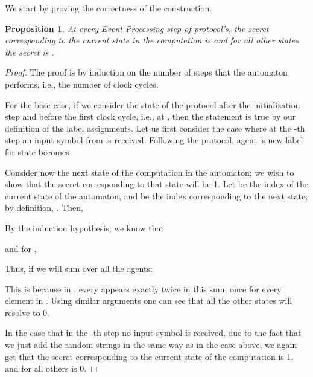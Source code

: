 \documentclass[letterpaper,11pt]{article}
\newtheorem{proposition}[theorem]{Proposition}
\begin{document}
We start by proving  the correctness of the construction.


\begin{proposition}
\label{prop-all}
At every Event Processing step of protocol's,
the secret corresponding
to the current state in the computation is  and for all other states 
the secret is .
\end{proposition}
\begin {proof}
The proof is
by induction on the number of steps  that the automaton performs, i.e., 
the number of clock cycles.

For the base case, if we consider the state of the protocol
after the initialization step and before the first clock cycle, i.e.,
at , then the statement is true by our definition of the label
assignments. Let us first consider the case where at the -th step
an input symbol  from  is received.  
Following the protocol,
agent 's new label for state  becomes


Consider now the next state of the computation in the automaton; we
wish to show that the secret corresponding to that state will be 1.
Let  be the index of the current state of the automaton, and
 be the index corresponding to the next state; by definition,
. Then, 
 
 

By the induction hypothesis, we know that 
 
and for , 
 

\noindent Thus, if we will sum over all the agents:



\noindent This is because in , 
every  appears exactly twice in this sum, once for
every 
element in . 
Using similar arguments one can see that all the other
states will resolve to 0.  

In the case that in the -th step no input symbol is received,
due to the fact that we just add the
random strings in the same way as in the case above,
we again get
that the secret corresponding to the current
state of the computation is 1, and for all others is 0.
\end {proof}
\end{document}
